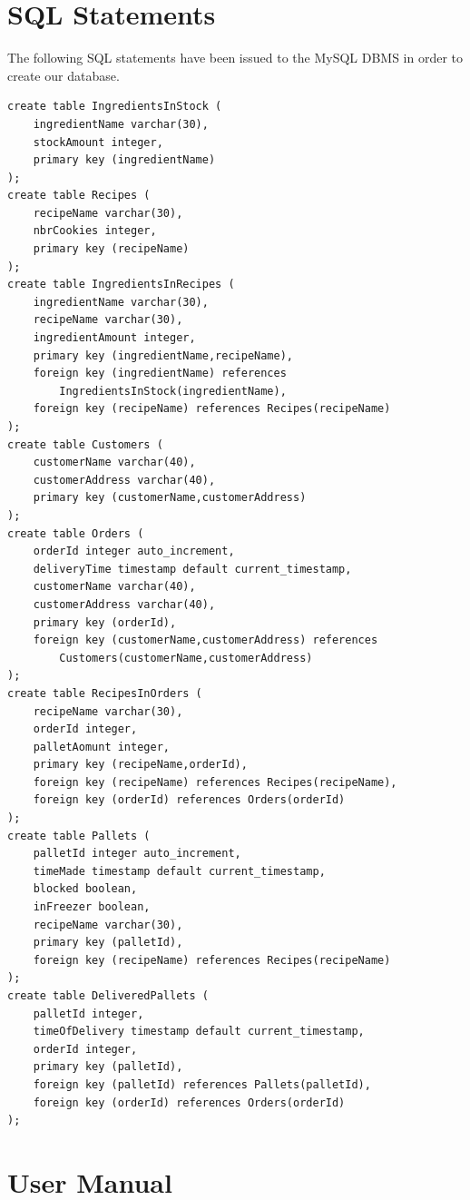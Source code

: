 \documentclass[a4paper]{article}
\begin{document}
\section{SQL Statements}
The following SQL statements have been issued to the MySQL DBMS in order to create our database.
\begin{Verbatim}
create table IngredientsInStock (
	ingredientName varchar(30),
	stockAmount integer,
	primary key (ingredientName)
);
create table Recipes (
	recipeName varchar(30),
	nbrCookies integer,
	primary key (recipeName)
);
create table IngredientsInRecipes (
	ingredientName varchar(30),
	recipeName varchar(30),
	ingredientAmount integer,
	primary key (ingredientName,recipeName),
	foreign key (ingredientName) references 
		IngredientsInStock(ingredientName),
	foreign key (recipeName) references Recipes(recipeName)
);
create table Customers (
	customerName varchar(40),
	customerAddress varchar(40),
	primary key (customerName,customerAddress)
);
create table Orders (
	orderId integer auto_increment,
	deliveryTime timestamp default current_timestamp,
	customerName varchar(40),
	customerAddress varchar(40),
	primary key (orderId),
	foreign key (customerName,customerAddress) references 
		Customers(customerName,customerAddress)
);
create table RecipesInOrders (
	recipeName varchar(30),
	orderId integer,
	palletAomunt integer,
	primary key (recipeName,orderId),
	foreign key (recipeName) references Recipes(recipeName),
	foreign key (orderId) references Orders(orderId)
);
create table Pallets (
	palletId integer auto_increment,
	timeMade timestamp default current_timestamp,
	blocked boolean,
	inFreezer boolean,
	recipeName varchar(30),
	primary key (palletId),
	foreign key (recipeName) references Recipes(recipeName)
);
create table DeliveredPallets (
	palletId integer,
	timeOfDelivery timestamp default current_timestamp,
	orderId integer,
	primary key (palletId),
	foreign key (palletId) references Pallets(palletId),
	foreign key (orderId) references Orders(orderId)
);
\end{Verbatim}

\section{User Manual}
\end{document}
